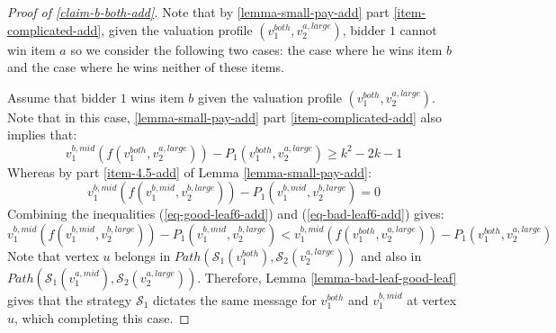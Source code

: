 \begin{proof}[Proof of \cref{claim-b-both-add}]
    Note that by \cref{lemma-small-pay-add} part \ref{item-complicated-add}, given the valuation profile $(v_1^{both},v_2^{a,large})$, bidder $1$ cannot win item $a$ so we consider the following two cases: the case where he wins item $b$ and the case where he wins neither of these items.

    Assume that bidder $1$ wins item $b$ given the valuation profile $(v_1^{both},v_2^{a,large})$. Note that in this case, \cref{lemma-small-pay-add} part \ref{item-complicated-add} also implies that:
    \begin{equation}\label{eq-good-leaf6-add}
 v_1^{b,mid}(f(v_1^{both},v_2^{a,large}))-P_1(v_1^{both},v_2^{a,large})\ge k^2 -2k-1   
\end{equation}
Whereas by part \ref{item-4.5-add} of Lemma \ref{lemma-small-pay-add}: 
 \begin{equation}\label{eq-bad-leaf6-add}
 v_1^{b,mid}(f(v_1^{b,mid},v_2^{b,large}))-P_1(v_1^{b,mid},v_2^{b,large})= 0   
\end{equation}
Combining the inequalities (\ref{eq-good-leaf6-add}) and (\ref{eq-bad-leaf6-add}) gives:
\begin{equation*}
 v_1^{b,mid}(f(v_1^{b,mid},v_2^{b,large}))-P_1(v_1^{b,mid},v_2^{b,large})< 
 v_1^{b,mid}(f(v_1^{both},v_2^{a,large}))-P_1(v_1^{both},v_2^{a,large})
\end{equation*}
Note that vertex $u$ belongs in $Path(\mathcal S_1(v_1^{both}),\mathcal S_2(v_2^{a,large}))$ and also in
$Path(\mathcal{S}_1(v_1^{a,mid}),\allowbreak\mathcal{S}_2(v_2^{a,large}))$. Therefore, Lemma \ref{lemma-bad-leaf-good-leaf} gives that the strategy $\mathcal S_1$ dictates the same message for  $v_1^{both}$ and $v_1^{b,mid}$ at vertex $u$, which completing this case.


\end{proof}
